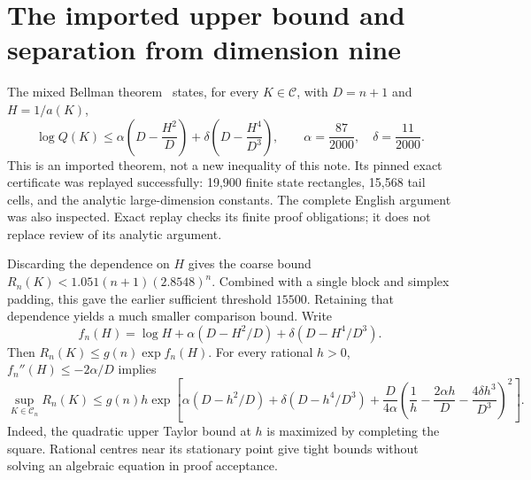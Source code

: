 \documentclass[11pt]{article}
\newcommand{\CC}{\mathcal C}
\begin{document}
\section{The imported upper bound and separation from dimension nine}
The mixed Bellman theorem~\cite{mxym-upper} states, for every $K\in\CC$,
with $D=n+1$ and $H=1/a(K)$,
\begin{equation}\label{eq:prior-upper}
 \log Q(K)\le\alpha\left(D-\frac{H^2}{D}\right)
                 +\delta\left(D-\frac{H^4}{D^3}\right),
 \qquad\alpha=\frac{87}{2000},\quad\delta=\frac{11}{2000}.
\end{equation}
This is an imported theorem, not a new inequality of this note.
Its pinned exact certificate was replayed successfully: 19,900 finite
state rectangles, 15,568 tail cells, and the analytic large-dimension
constants. The complete English argument was also inspected. Exact
replay checks its finite proof obligations; it does not replace review
of its analytic argument.

Discarding the dependence on $H$ gives the coarse bound
$R_n(K)<1.051(n+1)(2.8548)^n$. Combined with a single block and simplex
padding, this gave the earlier sufficient threshold $15500$.
Retaining that dependence yields a much smaller comparison bound.
Write
\[
 f_n(H)=\log H+\alpha(D-H^2/D)+\delta(D-H^4/D^3).
\]
Then $R_n(K)\le g(n)\exp f_n(H)$. For every rational $h>0$,
$f_n''(H)\le-2\alpha/D$ implies
\begin{equation}\label{eq:tangent-upper}
 \sup_{K\in\CC_n}R_n(K)
 \le g(n)h\exp\left[
 \alpha(D-h^2/D)+\delta(D-h^4/D^3)
       +\frac{D}{4\alpha}
        \left(\frac1h-\frac{2\alpha h}{D}
                         -\frac{4\delta h^3}{D^3}\right)^2\right].
\end{equation}
Indeed, the quadratic upper Taylor bound at $h$ is maximized by
completing the square. Rational centres near its stationary point give
tight bounds without solving an algebraic equation in proof acceptance.
\end{document}
